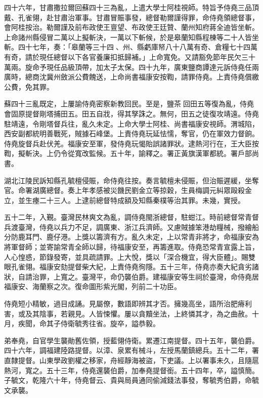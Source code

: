 \begin{pinyinscope}
四十六年，甘肅撒拉爾回蘇四十三為亂，上遣大學士阿桂視師。特旨予侍堯三品頂戴、孔雀翎，赴甘肅治軍事。甘肅冒賑事發，總督勒爾謹得罪，命侍堯領總督事，會阿桂按治。勒爾謹及前布政使王亶望、布政使王廷贊、蘭州知府蔣全迪皆坐斬。上命諸州縣侵冒二萬以上擬斬決，一萬以下斬候，於是皋蘭知縣程棟等二十人皆坐斬。四十七年，奏：「皋蘭等三十四、州、縣虧庫帑八十八萬有奇、倉糧七十四萬有奇，請於現任總督以下各官養廉扣抵歸補。」上命寬免。又請豁免節年民欠三十萬兩。旋命予現任品級頂帶，加太子太保。四十九年，廣東鹽商譚達元訴侍堯任兩廣時，總商沈冀州斂派公費餽送，上命尚書福康安按鞫，請罪侍堯。上責侍堯償繳公費，免其罪。

蘇四十三亂既定，上屢諭侍堯密察新教回民。至是，鹽茶回田五等復為亂，侍堯會固原提督剛塔捕田五。田五自戕，得其孥誅之。無何，田五之徒復攻靖遠。侍堯駐靖遠，令剛塔督兵往，亂久未定。上命大學士阿桂、尚書福康安視師。渭城陷，西安副都統明善戰死，賊據石峰堡。上責侍堯玩延怯懦，奪官，仍在軍效力督餉。侍堯旋督兵赴伏羌。福康安至軍，發侍堯玩愒貽誤諸罪狀。逮熱河行在，王大臣按鞫，擬斬決。上仍令從寬改監候。五十年，諭釋之。署正黃旗漢軍都統。署戶部尚書。

湖北江陵民訴知縣孔毓檀侵賑，命侍堯往按。奏言毓檀未侵賑，但治賑遲緩，坐奪官。命署湖廣總督。奏上年孝感被災饑民劉金立等掠穀，生員梅調元糾眾毆殺金立，並生瘞二十三人。上逮前總督特成額及知縣秦樸等治其罪。未幾，實授。

五十二年，入覲。臺灣民林爽文為亂，調侍堯閩浙總督，駐蚶江。時前總督常青督兵渡臺灣，侍堯以兵力不足，調廣東、浙江兵濟師。又慮賊據笨港劫糧械，撥繪船分防鹿耳門、鹿仔港。上獎以籌濟有方。亂久未定，上以常青非將才，命福康安為將軍督師；並寄諭常青全師以歸，待福康安至，再籌進取。侍堯恐常青宣露上旨，人心惶惑，節錄發寄，並具疏請罪。上大悅，獎以「深合機宜，得大臣體」。賜雙眼孔雀翎。福康安劾提督柴大紀，上責侍堯徇隱。五十三年，侍堯亦奏大紀貪劣諸狀，自請治罪，上寬之。臺灣平，命仍襲伯爵。建福康安等生祠於臺灣，命侍堯居福康安、海蘭察之次。復命圖形紫光閣，列前二十功臣。

侍堯短小精敏，過目成誦。見屬僚，數語即辨其才否。擁幾高坐，語所治肥瘠利害，或及其陰事，若親見。人皆悚懼。屢以貪黷坐法，上終憐其才，為之曲赦。十月，疾聞，命其子侍衛毓秀往省。旋卒，謚恭毅。

弟奉堯，自官學生襲勛舊佐領，授藍翎侍衛。累遷江南提督。四十五年，襲伯爵。四十六年，調福建陸路提督。以漳、泉累有械斗，左授馬蘭鎮總兵。五十二年，署直隸提督。山東學政劉權之移家，舟經靜海被盜，下吏議。上以署事未久，且隨扈熱河，寬之。五十三年，侍堯還襲伯爵，加奉堯提督銜。五十四年，卒，謚慎簡。子毓文，乾隆六十年，侍堯督云、貴與局員通同偷減錢法事發，奪毓秀伯爵，命毓文承襲。


\end{pinyinscope}
